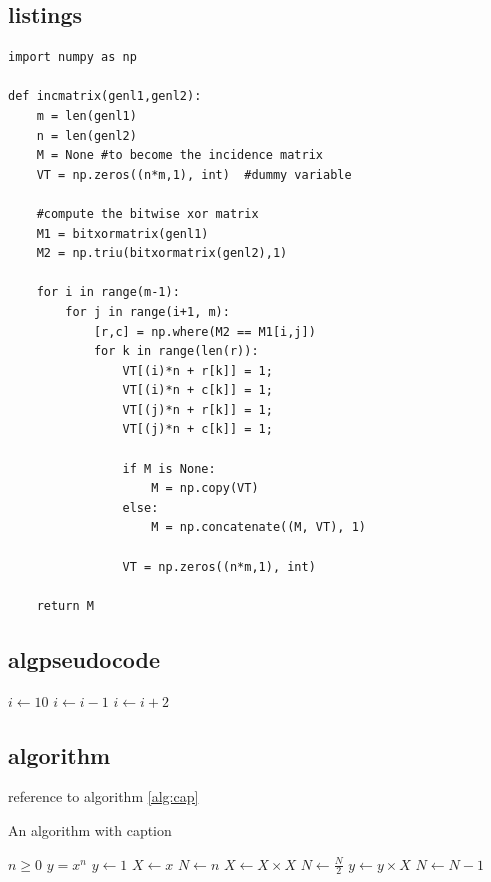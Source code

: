 \documentclass[a4paper, oneside]{book}
\begin{document}
\subsection{listings}
\begin{lstlisting}
import numpy as np
    
def incmatrix(genl1,genl2):
    m = len(genl1)
    n = len(genl2)
    M = None #to become the incidence matrix
    VT = np.zeros((n*m,1), int)  #dummy variable
    
    #compute the bitwise xor matrix
    M1 = bitxormatrix(genl1)
    M2 = np.triu(bitxormatrix(genl2),1) 

    for i in range(m-1):
        for j in range(i+1, m):
            [r,c] = np.where(M2 == M1[i,j])
            for k in range(len(r)):
                VT[(i)*n + r[k]] = 1;
                VT[(i)*n + c[k]] = 1;
                VT[(j)*n + r[k]] = 1;
                VT[(j)*n + c[k]] = 1;
                
                if M is None:
                    M = np.copy(VT)
                else:
                    M = np.concatenate((M, VT), 1)
                
                VT = np.zeros((n*m,1), int)
    
    return M
\end{lstlisting}

\subsection{algpseudocode}
\begin{algorithmic}
\State $i \gets 10$
    \State $i \gets i-1$
\Else
        \State $i \gets i+2$
    \EndIf
\EndIf 
\end{algorithmic}

\subsection{algorithm}

reference to algorithm \ref{alg:cap}
\begin{algorithm}[!h]
\caption{An algorithm with caption}\label{alg:cap}
\begin{algorithmic}
\Require $n \geq 0$
\Ensure $y = x^n$
\State $y \gets 1$
\State $X \gets x$
\State $N \gets n$
    \State $X \gets X \times X$
    \State $N \gets \frac{N}{2}$  
    \State $y \gets y \times X$
    \State $N \gets N - 1$
\EndIf
\EndWhile
\end{algorithmic}
\end{algorithm}
\end{document}
